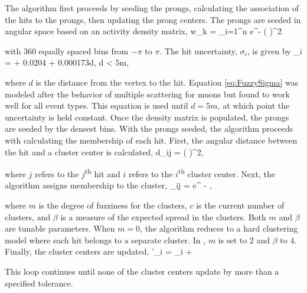 The algorithm first proceeds by seeding the prongs, calculating the association of the hits to the prongs, then updating the prong centers. The prongs are seeded in angular space based on an activity density matrix,
\beq
w_k = \sum_{i=1}^n e^{- \left(  \right)^2}
\label{eq:FuzzyDensity}
\eeq

\n with $360$ equally spaced bins from $-\pi$ to $\pi$. The hit uncertainty, $\sigma_i$, is given by
\beq
\sigma_i =  + 0.0204 + 0.000173d, \quad d < 5\unit{m},
\label{eq:FuzzySigma}
\eeq

\n where $d$ is the distance from the vertex to the hit. Equation \ref{eq:FuzzySigma} was modeled after the behavior of multiple scattering for muons but found to work well for all event types. This equation is used until $d = 5\unit{m}$, at which point the uncertainty is held constant. Once the density matrix is populated, the prongs are seeded by the densest bins. With the prongs seeded, the algorithm proceeds with calculating the membership of each hit. First, the angular distance between the hit and a cluster center is calculated,
\beq
d_{ij} = \left(  \right)^2,
\label{eq:Fuzzyd}
\eeq

\n where $j$ refers to the $j$\textsuperscript{th} hit and $i$ refers to the $i$\textsuperscript{th} cluster center. Next, the algorithm assigns membership to the cluster,
\beq
\mu_{ij} = e^{ -  },
\label{eq:Fuzzymu}
\eeq

\n where $m$ is the degree of fuzziness for the clusters, $c$ is the current number of clusters, and $\beta$ is a measure of the expected spread in the clusters. Both $m$ and $\beta$ are tunable parameters. When $m = 0$, the algorithm reduces to a hard clustering model where each hit belongs to a separate cluster. In \nova, $m$ is set to $2$ and $\beta$ to $4$. Finally, the cluster centers are updated.
\beq
\theta'_i = \theta_i + 
\label{eq:FuzzyUpdate}
\eeq

\n This loop continues until none of the cluster centers update by more than a specified tolerance.


